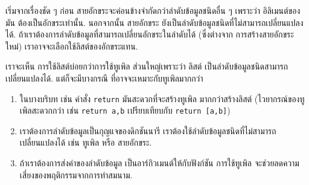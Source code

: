 
เริ่มจากเรื่องชัด ๆ ก่อน
สายอักขระจะค่อนข้างจำกัดกว่าลำดับข้อมูลชนิดอื่น ๆ
เพราะว่า อิลิเมนต์ของมัน ต้องเป็นอักขระเท่านั้น.
นอกจากนั้น สายอักขระ ยังเป็นลำดับข้อมูลชนิดที่ไม่สามารถเปลี่ยนแปลงได้.
ถ้าเราต้องการลำดับข้อมูลที่สามารถเปลี่ยนอักขระในลำดับได้ 
(ซึ่งต่างจาก การสร้างสายอักขระใหม่)
เราอาจจะเลือกใช้ลิสต์ของอักขระแทน.



เราจะเห็น การใช้ลิสต์บ่อยกว่าการใช้ทูเพิล
ส่วนใหญ่เพราะว่า ลิสต์ เป็นลำดับข้อมูลชนิดสามารถเปลี่ยนแปลงได้.
แต่ก็จะมีบางกรณี ที่อาจจะเหมาะกับทูเพิลมากกว่า

\begin{enumerate}


\item ในบางบริบท เช่น คำสั่ง \texttt{return} 
มันสะดวกที่จะสร้างทูเพิล มากกว่าสร้างลิสต์
(ไวยากรณ์ของทูเพิลสะดวกกว่า 
เช่น \texttt{return a,b} เปรียบเทียบกับ \texttt{return [a,b]})


\item เราต้องการลำดับข้อมูลเป็นกุญแจของดิกชันนารี
เราต้องใช้ลำดับข้อมูลชนิดที่ไม่สามารถเปลี่ยนแปลงได้ เช่น ทูเพิล หรือ สายอักขระ.


\item ถ้าเราต้องการส่งค่าของลำดับข้อมูล เป็นอาร์กิวเมนต์ให้กับฟังก์ชัน
การใช้ทูเพิล จะช่วยลดความเสี่ยงของพฤติกรรมจากการทำสมนาม.

\end{enumerate}


